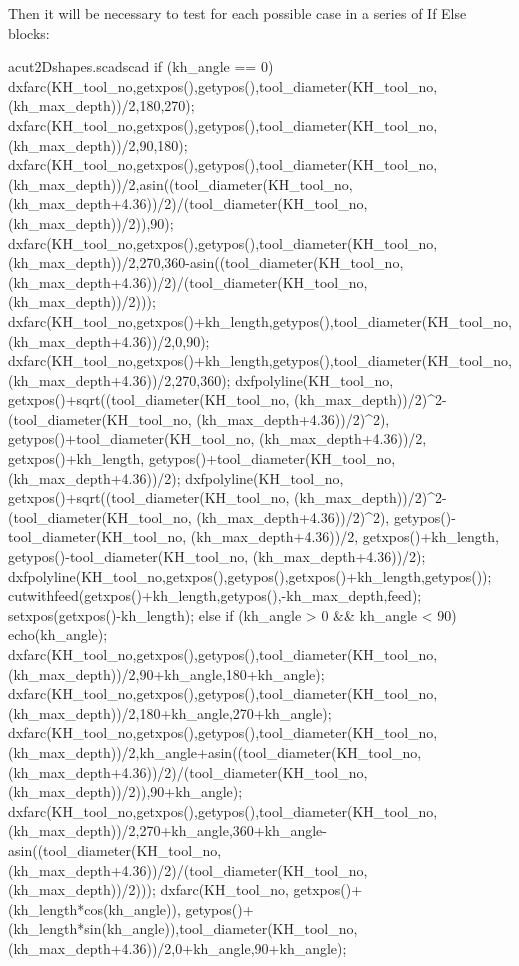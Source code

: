 \documentclass{ltxdoc}
\begin{document}
Then it will be necessary to test for each possible case in a series of If Else blocks:
 
\lstset{firstnumber=\thecuttwod}
\begin{writecode}{a}{cut2Dshapes.scad}{scad}
  if (kh_angle == 0) {
dxfarc(KH_tool_no,getxpos(),getypos(),tool_diameter(KH_tool_no, (kh_max_depth))/2,180,270);
dxfarc(KH_tool_no,getxpos(),getypos(),tool_diameter(KH_tool_no, (kh_max_depth))/2,90,180);
dxfarc(KH_tool_no,getxpos(),getypos(),tool_diameter(KH_tool_no, (kh_max_depth))/2,asin((tool_diameter(KH_tool_no, (kh_max_depth+4.36))/2)/(tool_diameter(KH_tool_no, (kh_max_depth))/2)),90);
dxfarc(KH_tool_no,getxpos(),getypos(),tool_diameter(KH_tool_no, (kh_max_depth))/2,270,360-asin((tool_diameter(KH_tool_no, (kh_max_depth+4.36))/2)/(tool_diameter(KH_tool_no, (kh_max_depth))/2)));
dxfarc(KH_tool_no,getxpos()+kh_length,getypos(),tool_diameter(KH_tool_no, (kh_max_depth+4.36))/2,0,90);
dxfarc(KH_tool_no,getxpos()+kh_length,getypos(),tool_diameter(KH_tool_no, (kh_max_depth+4.36))/2,270,360);
dxfpolyline(KH_tool_no,
 getxpos()+sqrt((tool_diameter(KH_tool_no, (kh_max_depth))/2)^2-(tool_diameter(KH_tool_no, (kh_max_depth+4.36))/2)^2),
 getypos()+tool_diameter(KH_tool_no, (kh_max_depth+4.36))/2,
 getxpos()+kh_length,
 getypos()+tool_diameter(KH_tool_no, (kh_max_depth+4.36))/2);
dxfpolyline(KH_tool_no,
 getxpos()+sqrt((tool_diameter(KH_tool_no, (kh_max_depth))/2)^2-(tool_diameter(KH_tool_no, (kh_max_depth+4.36))/2)^2),
 getypos()-tool_diameter(KH_tool_no, (kh_max_depth+4.36))/2,
 getxpos()+kh_length,
 getypos()-tool_diameter(KH_tool_no, (kh_max_depth+4.36))/2);
dxfpolyline(KH_tool_no,getxpos(),getypos(),getxpos()+kh_length,getypos());
 cutwithfeed(getxpos()+kh_length,getypos(),-kh_max_depth,feed);
 setxpos(getxpos()-kh_length);
  } else if (kh_angle > 0 && kh_angle < 90) {
echo(kh_angle);
  dxfarc(KH_tool_no,getxpos(),getypos(),tool_diameter(KH_tool_no, (kh_max_depth))/2,90+kh_angle,180+kh_angle);
  dxfarc(KH_tool_no,getxpos(),getypos(),tool_diameter(KH_tool_no, (kh_max_depth))/2,180+kh_angle,270+kh_angle);
dxfarc(KH_tool_no,getxpos(),getypos(),tool_diameter(KH_tool_no, (kh_max_depth))/2,kh_angle+asin((tool_diameter(KH_tool_no, (kh_max_depth+4.36))/2)/(tool_diameter(KH_tool_no, (kh_max_depth))/2)),90+kh_angle);
dxfarc(KH_tool_no,getxpos(),getypos(),tool_diameter(KH_tool_no, (kh_max_depth))/2,270+kh_angle,360+kh_angle-asin((tool_diameter(KH_tool_no, (kh_max_depth+4.36))/2)/(tool_diameter(KH_tool_no, (kh_max_depth))/2)));
dxfarc(KH_tool_no,
  getxpos()+(kh_length*cos(kh_angle)),
  getypos()+(kh_length*sin(kh_angle)),tool_diameter(KH_tool_no, (kh_max_depth+4.36))/2,0+kh_angle,90+kh_angle);
}
\end{writecode}
\end{document}
